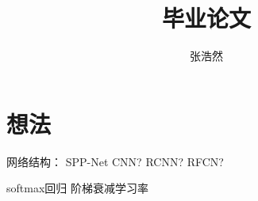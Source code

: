 \documentclass{article}
\title{毕业论文}
\author{张浩然}
\date{}
\begin{document}

\maketitle

\section{想法}
网络结构：
    SPP-Net
    CNN?
    RCNN?
    RFCN?

softmax回归
阶梯衰减学习率


\cite{name1}


\end{document}
